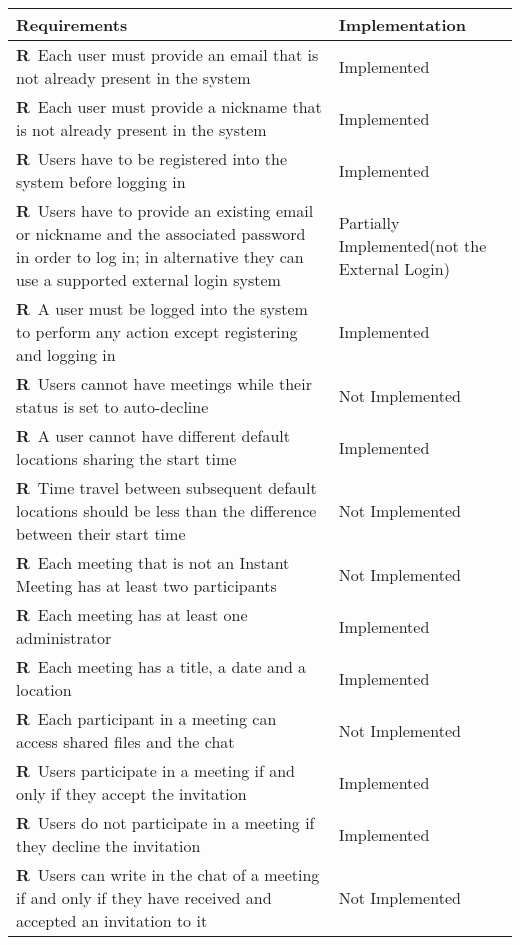 \def\arraystretch{1.5}
\begin{longtable}{|m{7cm}|m{7cm}|}
	\hline
	\textbf{Requirements}            & 		\textbf{Implementation}		    \\ \hline
	\textbf{R\reqNum}~Each user must provide an email that is not already present in the system & Implemented	\\ \hline
	\textbf{R\reqNum}~Each user must provide a nickname that is not already present in the system & Implemented	\\ \hline
	\textbf{R\reqNum}~Users have to be registered into the system before logging in & Implemented	\\ \hline
	\textbf{R\reqNum}~Users have to provide an existing email or nickname and the associated password in order to log in; in alternative they can use a supported external login system & Partially Implemented(not the External Login)	\\ \hline
	\textbf{R\reqNum}~A user must be logged into the system to perform any action except registering and logging in & Implemented	\\ \hline
	\textbf{R\reqNum}~Users cannot have meetings while their status is set to auto-decline & Not Implemented	\\ \hline
	\textbf{R\reqNum}~A user cannot have different default locations sharing the start time & Implemented	\\ \hline
	\textbf{R\reqNum}~Time travel between subsequent default locations should be less than the difference between their start time & Not Implemented	\\ \hline
	\textbf{R\reqNum}~Each meeting that is not an Instant Meeting has at least two participants & Not Implemented	\\ \hline
	\textbf{R\reqNum}~Each meeting has at least one administrator & Implemented	\\ \hline
	\textbf{R\reqNum}~Each meeting has a title, a date and a location & Implemented	\\ \hline
	\textbf{R\reqNum}~Each participant in a meeting can access shared files and the chat & Not Implemented \\ \hline
	\textbf{R\reqNum}~Users participate in a meeting if and only if they accept the invitation & Implemented	\\ \hline
	\textbf{R\reqNum}~Users do not participate in a meeting if they decline the invitation & Implemented	\\ \hline
	\textbf{R\reqNum}~Users can write in the chat of a meeting if and only if they have received and accepted an invitation to it & Not Implemented	\\ \hline

\end{longtable}
